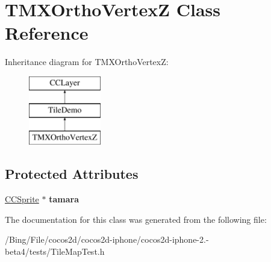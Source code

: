 \hypertarget{interface_t_m_x_ortho_vertex_z}{\section{T\-M\-X\-Ortho\-Vertex\-Z Class Reference}
\label{interface_t_m_x_ortho_vertex_z}
}
Inheritance diagram for T\-M\-X\-Ortho\-Vertex\-Z\-:\begin{figure}[H]
\begin{center}
\leavevmode
\includegraphics[height=3.000000cm]{interface_t_m_x_ortho_vertex_z}
\end{center}
\end{figure}
\subsection*{Protected Attributes}
\begin{DoxyCompactItemize}
\item 
\hypertarget{interface_t_m_x_ortho_vertex_z_a8402cfa066f50a6c42ec2657ca87cbe4}{\hyperlink{class_c_c_sprite}{C\-C\-Sprite} $\ast$ {\bfseries tamara}}\label{interface_t_m_x_ortho_vertex_z_a8402cfa066f50a6c42ec2657ca87cbe4}

\end{DoxyCompactItemize}


The documentation for this class was generated from the following file\-:\begin{DoxyCompactItemize}
\item 
/\-Bing/\-File/cocos2d/cocos2d-\/iphone/cocos2d-\/iphone-\/2.-\/beta4/tests/Tile\-Map\-Test.\-h\end{DoxyCompactItemize}
